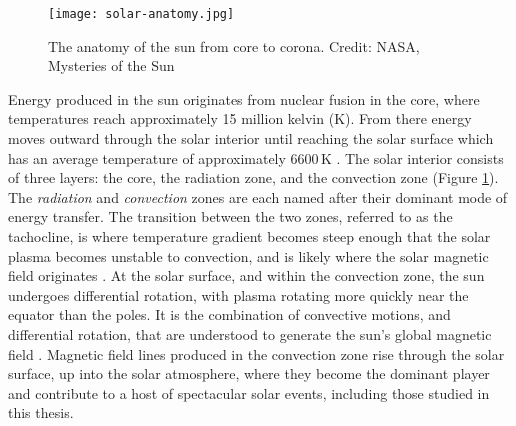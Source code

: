 \begin{figure}
	\texttt{[image: solar-anatomy.jpg]}
	\caption{The anatomy of the sun from core to corona. Credit: NASA, Mysteries of the Sun}
	\label{fig:anatomy}
\end{figure} 
 

Energy produced in the sun originates from nuclear fusion in the core, where temperatures reach approximately 15 million kelvin (K).
From there energy moves outward through the solar interior until reaching the solar surface which has an average temperature of approximately 6600\,K  \citep{SolarPhysicsOverview}. 
The solar interior consists of three layers: the core, the radiation zone, and the convection zone (Figure \ref{fig:anatomy}).
The \emph{radiation} and \emph{convection} zones are each named after their dominant mode of energy transfer.
The transition between the two zones, referred to as the tachocline, is where temperature gradient becomes steep enough that the solar plasma becomes unstable to convection, and is likely where the solar magnetic field originates \citep{SolarPhysicsOverview}.
At the solar surface, and within the convection zone, the sun undergoes differential rotation, with plasma rotating more quickly near the equator than the poles.
It is the combination of convective motions, and differential rotation, that are understood to generate the sun's global magnetic field \citep{Parker1979,Priest2014,JudgeBook}.
Magnetic field lines produced in the convection zone rise through the solar surface, up into the solar atmosphere, where they become the dominant player and contribute to a host of spectacular solar events, including those studied in this thesis.


